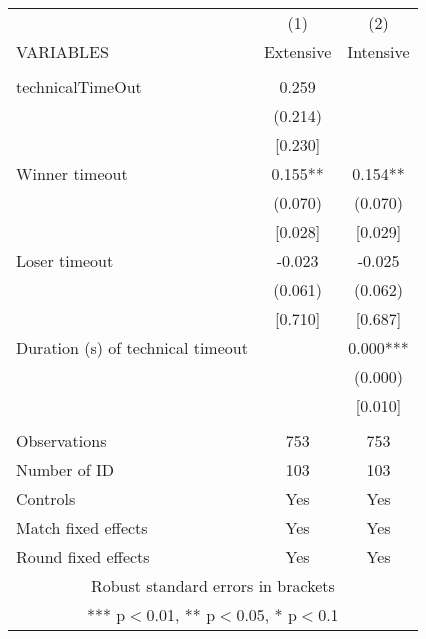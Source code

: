 \documentclass[]{article}
\begin{document}
\begin{tabular}{lcc} \hline
 & (1) & (2) \\
VARIABLES & Extensive & Intensive \\ \hline
 &  &  \\
technicalTimeOut & 0.259 &  \\
 & (0.214) &  \\
 & [0.230] &  \\
Winner timeout & 0.155** & 0.154** \\
 & (0.070) & (0.070) \\
 & [0.028] & [0.029] \\
Loser timeout & -0.023 & -0.025 \\
 & (0.061) & (0.062) \\
 & [0.710] & [0.687] \\
Duration (s) of technical timeout &  & 0.000*** \\
 &  & (0.000) \\
 &  & [0.010] \\
 &  &  \\
Observations & 753 & 753 \\
Number of ID & 103 & 103 \\
Controls & Yes & Yes \\
Match fixed effects & Yes & Yes \\
 Round fixed effects & Yes & Yes \\ \hline
\multicolumn{3}{c}{ Robust standard errors in brackets} \\
\multicolumn{3}{c}{ *** p$<$0.01, ** p$<$0.05, * p$<$0.1} \\
\end{tabular}
\end{document}
